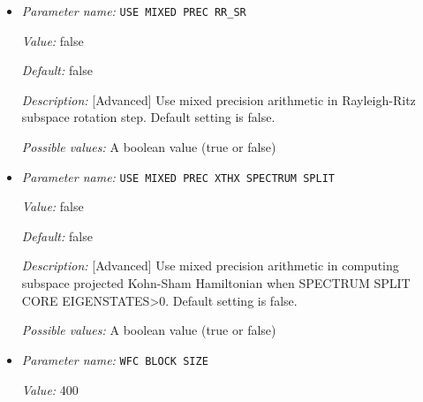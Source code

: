 \begin{itemize}
{\it Value:} false


{\it Default:} false


{\it Description:} [Advanced] Use a modified single precision algorithm for Chebyshev filtering. This cannot be used in conjunction with spectrum splitting. Default setting is false.

{\it Possible values:} A boolean value (true or false)

\item {\it Parameter name:} {\tt USE MIXED PREC RR\_SR}
\label{parameters:SCF parameters/Eigen_2dsolver parameters/USE MIXED PREC RR_5fSR}
\label{parameters:SCF_20parameters/Eigen_2dsolver_20parameters/USE_20MIXED_20PREC_20RR_5fSR}


{\it Value:} false


{\it Default:} false


{\it Description:} [Advanced] Use mixed precision arithmetic in Rayleigh-Ritz subspace rotation step. Default setting is false.


{\it Possible values:} A boolean value (true or false)
\item {\it Parameter name:} {\tt USE MIXED PREC XTHX SPECTRUM SPLIT}
\label{parameters:SCF parameters/Eigen_2dsolver parameters/USE MIXED PREC XTHX SPECTRUM SPLIT}
\label{parameters:SCF_20parameters/Eigen_2dsolver_20parameters/USE_20MIXED_20PREC_20XTHX_20SPECTRUM_20SPLIT}


{\it Value:} false


{\it Default:} false


{\it Description:} [Advanced] Use mixed precision arithmetic in computing subspace projected Kohn-Sham Hamiltonian when SPECTRUM SPLIT CORE EIGENSTATES>0.  Default setting is false.


{\it Possible values:} A boolean value (true or false)
\item {\it Parameter name:} {\tt WFC BLOCK SIZE}
\label{parameters:SCF parameters/Eigen_2dsolver parameters/WFC BLOCK SIZE}
\label{parameters:SCF_20parameters/Eigen_2dsolver_20parameters/WFC_20BLOCK_20SIZE}


{\it Value:} 400



\end{itemize}
